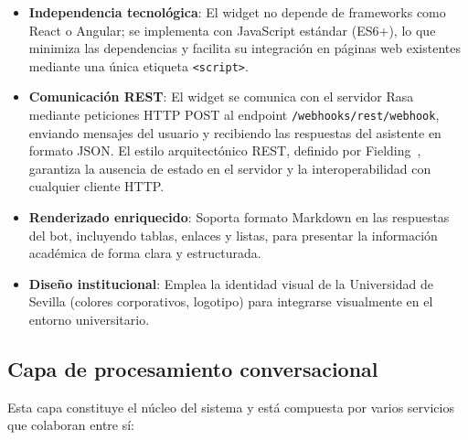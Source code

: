 \begin{itemize}
    \item \textbf{Independencia tecnológica}: El widget no depende de frameworks como React o Angular; se implementa con JavaScript estándar (ES6+), lo que minimiza las dependencias y facilita su integración en páginas web existentes mediante una única etiqueta \texttt{<script>}.
    \item \textbf{Comunicación REST}: El widget se comunica con el servidor Rasa mediante peticiones HTTP POST al endpoint \texttt{/webhooks/rest/webhook}, enviando mensajes del usuario y recibiendo las respuestas del asistente en formato JSON. El estilo arquitectónico REST, definido por Fielding~\cite{fielding2000rest}, garantiza la ausencia de estado en el servidor y la interoperabilidad con cualquier cliente HTTP.
    \item \textbf{Renderizado enriquecido}: Soporta formato Markdown en las respuestas del bot, incluyendo tablas, enlaces y listas, para presentar la información académica de forma clara y estructurada.
    \item \textbf{Diseño institucional}: Emplea la identidad visual de la Universidad de Sevilla (colores corporativos, logotipo) para integrarse visualmente en el entorno universitario.
\end{itemize}

\subsection{Capa de procesamiento conversacional}\label{subsec:capa-procesamiento}

Esta capa constituye el núcleo del sistema y está compuesta por varios servicios que colaboran entre sí:

